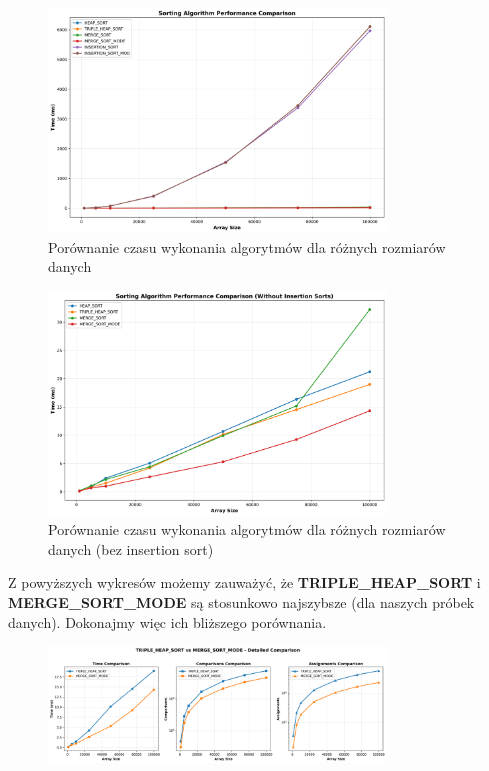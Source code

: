 \documentclass[12pt,a4paper]{article}
\begin{document}
\begin{figure}[H]
\centering
\includegraphics[width=0.8\textwidth]{algorithm_performance.png}
\caption{Porównanie czasu wykonania algorytmów dla różnych rozmiarów danych}
\end{figure}

\begin{figure}[H]
\centering
\includegraphics[width=0.8\textwidth]{algorithm_performance_no_insertion.png}
\caption{Porównanie czasu wykonania algorytmów dla różnych rozmiarów danych (bez insertion sort)}
\end{figure}

Z powyższych wykresów możemy zauważyć, że \textbf{TRIPLE\_HEAP\_SORT} i
\textbf{MERGE\_SORT\_MODE} są stosunkowo najszybsze (dla naszych próbek danych). Dokonajmy więc ich bliższego porównania.

\begin{figure}[H]
\centering
\includegraphics[width=0.8\textwidth]{best_algorithms_comparison.png}
\caption{}
\end{figure}
\end{document}
